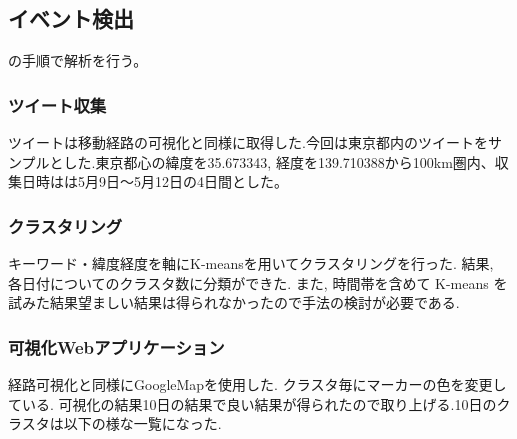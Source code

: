 \subsection{イベント検出}
の手順で解析を行う。

\subsubsection{ツイート収集}
ツイートは移動経路の可視化と同様に取得した.今回は東京都内のツイートをサンプルとした.東京都心の緯度を35.673343, 経度を139.710388から100km圏内、収集日時はは5月9日〜5月12日の4日間とした。

\subsubsection{クラスタリング}
キーワード・緯度経度を軸にK-meansを用いてクラスタリングを行った.
結果, 各日付についてのクラスタ数に分類ができた.
また, 時間帯を含めて K-means を試みた結果望ましい結果は得られなかったので手法の検討が必要である.


\subsubsection{可視化Webアプリケーション}
経路可視化と同様にGoogleMapを使用した. クラスタ毎にマーカーの色を変更している.
可視化の結果10日の結果で良い結果が得られたので取り上げる.10日のクラスタは以下の様な一覧になった.



